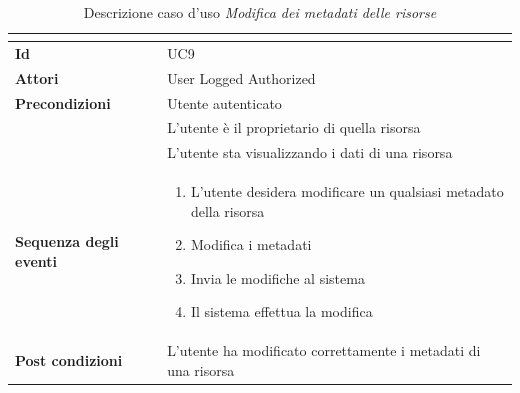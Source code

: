 \documentclass[a4paper]{article}
\begin{document}
\begin{table}[H]
    \centering
    \renewcommand{\arraystretch}{1.5}
    \begin{tabular}{|>{\bfseries}l|p{10cm}|}
        \hline
        \multicolumn{2}{|c|}{\textbf{Caso d'uso: Modifica dei metadati delle risorse}} \\
        \hline
        \textbf{Id} & UC9 \\ \hline
        \textbf{Attori} & User Logged Authorized \\ \hline
        \textbf{Precondizioni} & Utente autenticato \\
        & L'utente è il proprietario di quella risorsa \\
        & L'utente sta visualizzando i dati di una risorsa \\ \hline
        \textbf{Sequenza degli eventi} &
        \begin{enumerate}
            \item L'utente desidera modificare un qualsiasi metadato della risorsa
            \item Modifica i metadati
            \item Invia le modifiche al sistema
            \item Il sistema effettua la modifica
        \end{enumerate}\\ \hline
        \textbf{Post condizioni} & L'utente ha modificato correttamente i metadati di una risorsa \\ \hline
    \end{tabular}
    \caption{Descrizione caso d'uso \textit{Modifica dei metadati delle risorse}}
    \label{tab:modify_metadata_uc9-usecase}
\end{table}
\end{document}
